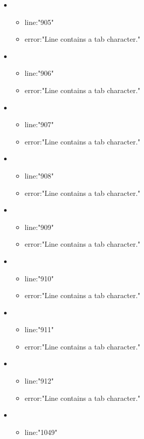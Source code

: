 \begin{itemize}
	\item 
	\begin{itemize} 
		\item line:"905" 
		\item error:"Line contains a tab character." 
	\end{itemize}
	\item 
	\begin{itemize} 
		\item line:"906" 
		\item error:"Line contains a tab character." 
	\end{itemize}
	\item 
	\begin{itemize} 
		\item line:"907" 
		\item error:"Line contains a tab character." 
	\end{itemize}
	\item 
	\begin{itemize} 
		\item line:"908" 
		\item error:"Line contains a tab character." 
	\end{itemize}
	\item 
	\begin{itemize} 
		\item line:"909" 
		\item error:"Line contains a tab character." 
	\end{itemize}
	\item 
	\begin{itemize} 
		\item line:"910" 
		\item error:"Line contains a tab character." 
	\end{itemize}
	\item 
	\begin{itemize} 
		\item line:"911" 
		\item error:"Line contains a tab character." 
	\end{itemize}
	\item 
	\begin{itemize} 
		\item line:"912" 
		\item error:"Line contains a tab character." 
	\end{itemize}
	\item 
	\begin{itemize} 
		\item line:"1049" 

\end{itemize}
\end{itemize}

